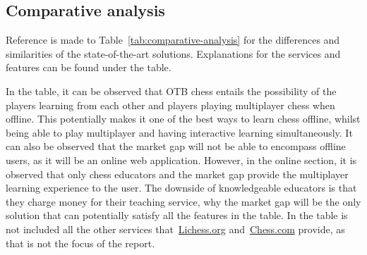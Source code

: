 \subsection{Comparative analysis}\label{subsec:comparative-analysis}

Reference is made to Table~\ref{tab:comparative-analysis} for the differences and similarities of the state-of-the-art
solutions. Explanations for the services and features can be found under the table.

In the table, it can be observed that OTB chess entails the possibility of the players learning from each other and
players playing multiplayer chess when offline.
This potentially makes it one of the best ways to learn chess offline, whilst being able to play multiplayer and having
interactive learning simultaneously.
It can also be observed that the market gap will not be able to encompass offline users, as it will be an online web
application.
However, in the online section, it is observed that only chess educators and the market gap provide the multiplayer
learning experience to the user.
The downside of knowledgeable educators is that they charge money for their teaching service, why the market gap will be
the only solution that can potentially satisfy all the features in the table.
In the table is not included all the other services that~\url{Lichess.org} and~\url{Chess.com} provide, as that is not
the focus of the report.


